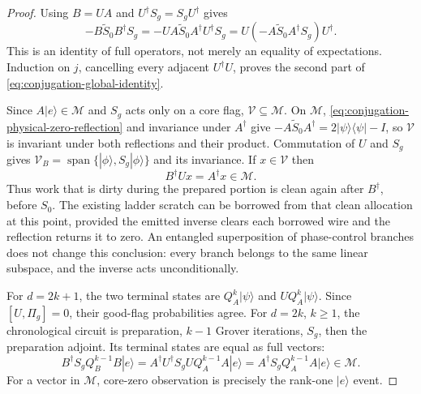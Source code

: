 \begin{proof}
Using $B=UA$ and $U^\dagger S_g=S_gU^\dagger$ gives
\begin{equation}
 -B\widetilde S_0B^\dagger S_g
 =-U A\widetilde S_0A^\dagger U^\dagger S_g
 =U(-A\widetilde S_0A^\dagger S_g)U^\dagger.
 \label{eq:conjugation-identity-derivation}
\end{equation}
This is an identity of full operators, not merely an equality of
expectations. Induction on $j$, cancelling every adjacent
$U^\dagger U$, proves the second part of
\eqref{eq:conjugation-global-identity}.

Since $A|e\rangle\in\mathcal M$ and $S_g$ acts only on a core flag,
$\mathcal V\subseteq\mathcal M$. On $\mathcal M$,
\eqref{eq:conjugation-physical-zero-reflection} and invariance under
$A^\dagger$ give
$-A\widetilde S_0A^\dagger=2|\psi\rangle\langle\psi|-I$, so
$\mathcal V$ is invariant under both reflections and their product.
Commutation of $U$ and $S_g$ gives
$\mathcal V_B=\operatorname{span}\{|\phi\rangle,S_g|\phi\rangle\}$
and its invariance. If $x\in\mathcal V$ then
\begin{equation}
 B^\dagger Ux=A^\dagger x\in\mathcal M.
 \label{eq:conjugation-restored-cleanliness}
\end{equation}
Thus work that is dirty during the prepared portion is clean again
after $B^\dagger$, before $S_0$. The existing ladder scratch can be
borrowed from that clean allocation at this point, provided the
emitted inverse clears each borrowed wire and the reflection returns
it to zero. An entangled superposition of phase-control branches does
not change this conclusion: every branch belongs to the same linear
subspace, and the inverse acts unconditionally.

For $d=2k+1$, the two terminal states are
$Q_A^k|\psi\rangle$ and $UQ_A^k|\psi\rangle$. Since
$[U,\Pi_g]=0$, their good-flag probabilities agree. For $d=2k$,
$k\geq1$, the chronological circuit is preparation, $k-1$ Grover
iterations, $S_g$, then the preparation adjoint. Its terminal states
are equal as full vectors:
\begin{equation}
 B^\dagger S_g Q_B^{k-1}B|e\rangle
 =A^\dagger U^\dagger S_gUQ_A^{k-1}A|e\rangle
 =A^\dagger S_gQ_A^{k-1}A|e\rangle\in\mathcal M.
 \label{eq:conjugation-even-state}
\end{equation}
For a vector in $\mathcal M$, core-zero observation is precisely the
rank-one $|e\rangle$ event.


\end{proof}

